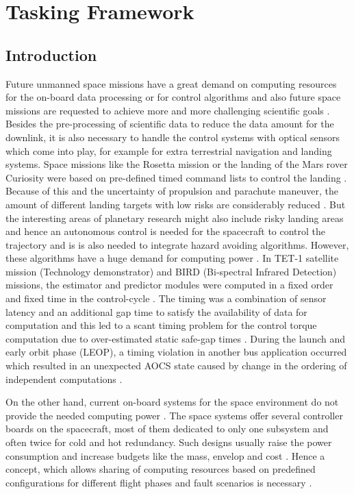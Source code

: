 
\chapter{Tasking Framework}
\section{Introduction}
Future unmanned space missions have a great demand on computing resources for the on-board data processing or for control algorithms and also future space missions are requested to achieve more and more challenging scientific goals \cite{PhdThesis}. Besides the pre-processing of scientific data to reduce the data amount for the downlink, it is also necessary to handle the control systems with optical sensors which come into play, for example for extra terrestrial navigation and landing systems. Space missions like the Rosetta mission or the landing of the Mars rover Curiosity were based on pre-defined timed command lists to control the landing \cite{TaskFr}. Because of this and the uncertainty of propulsion and parachute maneuver, the amount of different landing targets with low risks are considerably reduced \cite{TaskFr}. But the interesting areas of planetary research might also include risky landing areas and hence an autonomous control is needed for the spacecraft to control the trajectory and is is also needed to integrate hazard avoiding algorithms. However, these algorithms have a huge demand for computing power \cite{TaskFr}. In TET-1 satellite mission (Technology demonstrator) and BIRD (Bi-spectral Infrared Detection) missions, the estimator and predictor modules were computed in a fixed order and fixed time in the control-cycle \cite{TETBIRD}. The timing was a combination of sensor latency and an additional gap time to satisfy the availability of data for computation and this led to a scant timing problem for the control torque computation due to over-estimated static safe-gap times \cite{TETBIRD,TETtoEUCROPIS}. During the launch and early orbit phase (LEOP), a timing violation in another bus application occurred which resulted in an unexpected AOCS state caused by change in the ordering of independent computations \cite{TETBIRD}.

On the other hand, current on-board systems for the space environment do not provide the needed computing power \cite{TaskFr}. The space systems offer several controller boards on the spacecraft, most of them dedicated to only one subsystem and often twice for cold and hot redundancy. Such designs usually raise the power consumption and increase budgets like the mass, envelop and cost \cite{TaskFr}. Hence a concept, which allows sharing of computing resources based on predefined configurations for different flight phases and fault scenarios is necessary \cite{TaskFr}.

